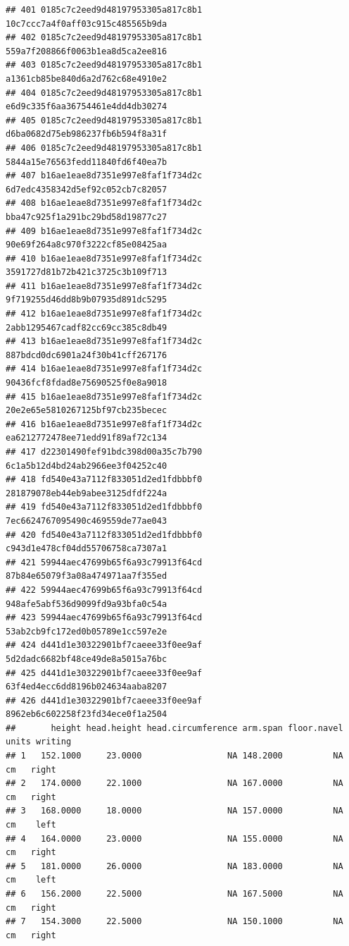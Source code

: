 \documentclass[]{article}
\begin{document}
\begin{verbatim}
## 401 0185c7c2eed9d48197953305a817c8b1     10c7ccc7a4f0aff03c915c485565b9da
## 402 0185c7c2eed9d48197953305a817c8b1     559a7f208866f0063b1ea8d5ca2ee816
## 403 0185c7c2eed9d48197953305a817c8b1     a1361cb85be840d6a2d762c68e4910e2
## 404 0185c7c2eed9d48197953305a817c8b1     e6d9c335f6aa36754461e4dd4db30274
## 405 0185c7c2eed9d48197953305a817c8b1     d6ba0682d75eb986237fb6b594f8a31f
## 406 0185c7c2eed9d48197953305a817c8b1     5844a15e76563fedd11840fd6f40ea7b
## 407 b16ae1eae8d7351e997e8faf1f734d2c     6d7edc4358342d5ef92c052cb7c82057
## 408 b16ae1eae8d7351e997e8faf1f734d2c     bba47c925f1a291bc29bd58d19877c27
## 409 b16ae1eae8d7351e997e8faf1f734d2c     90e69f264a8c970f3222cf85e08425aa
## 410 b16ae1eae8d7351e997e8faf1f734d2c     3591727d81b72b421c3725c3b109f713
## 411 b16ae1eae8d7351e997e8faf1f734d2c     9f719255d46dd8b9b07935d891dc5295
## 412 b16ae1eae8d7351e997e8faf1f734d2c     2abb1295467cadf82cc69cc385c8db49
## 413 b16ae1eae8d7351e997e8faf1f734d2c     887bdcd0dc6901a24f30b41cff267176
## 414 b16ae1eae8d7351e997e8faf1f734d2c     90436fcf8fdad8e75690525f0e8a9018
## 415 b16ae1eae8d7351e997e8faf1f734d2c     20e2e65e5810267125bf97cb235becec
## 416 b16ae1eae8d7351e997e8faf1f734d2c     ea6212772478ee71edd91f89af72c134
## 417 d22301490fef91bdc398d00a35c7b790     6c1a5b12d4bd24ab2966ee3f04252c40
## 418 fd540e43a7112f833051d2ed1fdbbbf0     281879078eb44eb9abee3125dfdf224a
## 419 fd540e43a7112f833051d2ed1fdbbbf0     7ec6624767095490c469559de77ae043
## 420 fd540e43a7112f833051d2ed1fdbbbf0     c943d1e478cf04dd55706758ca7307a1
## 421 59944aec47699b65f6a93c79913f64cd     87b84e65079f3a08a474971aa7f355ed
## 422 59944aec47699b65f6a93c79913f64cd     948afe5abf536d9099fd9a93bfa0c54a
## 423 59944aec47699b65f6a93c79913f64cd     53ab2cb9fc172ed0b05789e1cc597e2e
## 424 d441d1e30322901bf7caeee33f0ee9af     5d2dadc6682bf48ce49de8a5015a76bc
## 425 d441d1e30322901bf7caeee33f0ee9af     63f4ed4ecc6dd8196b024634aaba8207
## 426 d441d1e30322901bf7caeee33f0ee9af     8962eb6c602258f23fd34ece0f1a2504
##       height head.height head.circumference arm.span floor.navel  units writing
## 1   152.1000     23.0000                 NA 148.2000          NA     cm   right
## 2   174.0000     22.1000                 NA 167.0000          NA     cm   right
## 3   168.0000     18.0000                 NA 157.0000          NA     cm    left
## 4   164.0000     23.0000                 NA 155.0000          NA     cm   right
## 5   181.0000     26.0000                 NA 183.0000          NA     cm    left
## 6   156.2000     22.5000                 NA 167.5000          NA     cm   right
## 7   154.3000     22.5000                 NA 150.1000          NA     cm   right

\end{verbatim}
\end{document}
